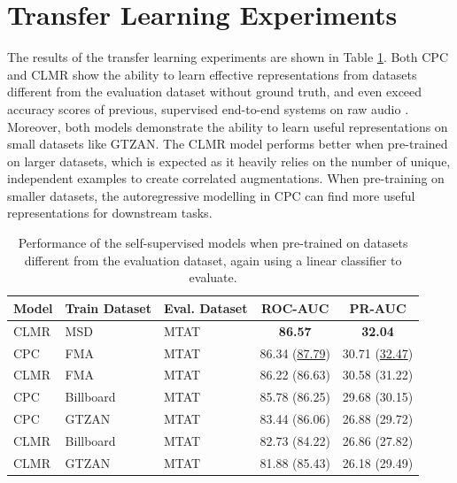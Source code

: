 \section{Transfer Learning Experiments}
The results of the transfer learning experiments are shown in Table \ref{tab:magnatagatune_results}.
Both CPC and CLMR show the ability to learn effective representations from datasets different from the evaluation dataset without ground truth, and even exceed accuracy scores of previous, supervised end-to-end systems on raw audio \cite{dieleman2014end}.
Moreover, both models demonstrate the ability to learn useful representations on small datasets like GTZAN.
The CLMR model performs better when pre-trained on larger datasets, which is expected as it heavily relies on the number of unique, independent examples to create correlated augmentations.
When pre-training on smaller datasets, the autoregressive modelling in CPC can find more useful representations for downstream tasks.

\begin{table}[h]
    \centering
    \begin{tabular}{@{}lllcc@{}}\toprule
        Model & Train Dataset & Eval.
        Dataset &  ROC-AUC & PR-AUC \\ \midrule
        CLMR & MSD & MTAT &  \textbf{86.57} & \textbf{32.04} \\
        CPC & FMA & MTAT & 86.34 (\underline{87.79}) & 30.71 (\underline{32.47}) \\
        CLMR & FMA & MTAT & 86.22 (86.63) & 30.58 (31.22) \\
        CPC & Billboard & MTAT & 85.78 (86.25) & 29.68 (30.15) \\
        CPC & GTZAN & MTAT & 83.44 (86.06) & 26.88 (29.72) \\
        CLMR & Billboard & MTAT & 82.73 (84.22) & 26.86 (27.82) \\
        CLMR & GTZAN & MTAT & 81.88 (85.43) & 26.18 (29.49) \\
        \bottomrule
    \end{tabular}
    \caption{Performance of the self-supervised models when pre-trained on datasets different from the evaluation dataset, again using a linear classifier to evaluate.}
    \label{tab:magnatagatune_results}
\end{table}


